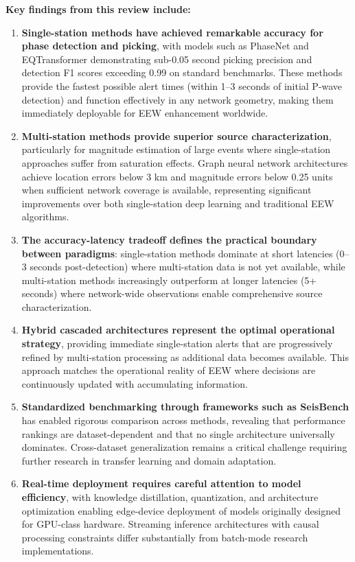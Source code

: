 \documentclass[review,authoryear]{elsarticle}
\begin{document}
\textbf{Key findings from this review include:}

\begin{enumerate}
\item \textbf{Single-station methods have achieved remarkable accuracy for phase detection and picking}, with models such as PhaseNet and EQTransformer demonstrating sub-0.05 second picking precision and detection F1 scores exceeding 0.99 on standard benchmarks. These methods provide the fastest possible alert times (within 1--3 seconds of initial P-wave detection) and function effectively in any network geometry, making them immediately deployable for EEW enhancement worldwide.

\item \textbf{Multi-station methods provide superior source characterization}, particularly for magnitude estimation of large events where single-station approaches suffer from saturation effects. Graph neural network architectures achieve location errors below 3 km and magnitude errors below 0.25 units when sufficient network coverage is available, representing significant improvements over both single-station deep learning and traditional EEW algorithms.

\item \textbf{The accuracy-latency tradeoff defines the practical boundary between paradigms}: single-station methods dominate at short latencies (0--3 seconds post-detection) where multi-station data is not yet available, while multi-station methods increasingly outperform at longer latencies (5+ seconds) where network-wide observations enable comprehensive source characterization.

\item \textbf{Hybrid cascaded architectures represent the optimal operational strategy}, providing immediate single-station alerts that are progressively refined by multi-station processing as additional data becomes available. This approach matches the operational reality of EEW where decisions are continuously updated with accumulating information.

\item \textbf{Standardized benchmarking through frameworks such as SeisBench} has enabled rigorous comparison across methods, revealing that performance rankings are dataset-dependent and that no single architecture universally dominates. Cross-dataset generalization remains a critical challenge requiring further research in transfer learning and domain adaptation.

\item \textbf{Real-time deployment requires careful attention to model efficiency}, with knowledge distillation, quantization, and architecture optimization enabling edge-device deployment of models originally designed for GPU-class hardware. Streaming inference architectures with causal processing constraints differ substantially from batch-mode research implementations.
\end{enumerate}
\end{document}
